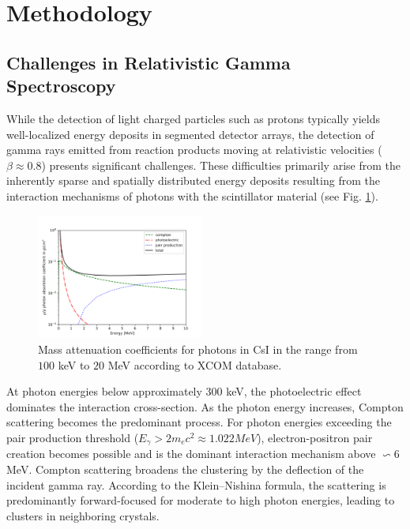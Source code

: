 \documentclass[final,5p,times,twocolumn]{elsarticle}
\begin{document}
\section{Methodology}
\label{sec:metho}
\subsection{Challenges in Relativistic Gamma Spectroscopy}\label{s_sec:gamma_spec}
While the detection of light charged particles such as protons typically yields well-localized energy deposits in segmented detector arrays, the detection of gamma rays emitted from reaction products moving at relativistic velocities ($\beta \approx 0.8$) presents significant challenges. These difficulties primarily arise from the inherently sparse and spatially distributed energy deposits resulting from the interaction mechanisms of photons with the scintillator material (see Fig. \ref{fig:csi})\cite{kolanoski2016teilchendetektoren}.\newline
\begin{figure}[!htb]
	\centering 
	\includegraphics[width=0.49\textwidth]{csi_attuenuation.png}	
	\caption{Mass attenuation coefficients for photons in CsI in the range from $100$ keV to $20$ MeV according to XCOM database\cite{seltzer2010xcom}.} 
	\label{fig:csi}%
\end{figure}
At photon energies below approximately $300$ keV, the photoelectric effect dominates the interaction cross-section. As the photon energy increases, Compton scattering becomes the predominant process. For photon energies exceeding the pair production threshold ($E_{\gamma} > 2m_{e}c^2 \approx 1.022 MeV$), electron-positron pair creation becomes possible and is the dominant interaction mechanism above $\backsim 6$ MeV.\newline
Compton scattering broadens the clustering by the deflection of the incident gamma ray. According to the Klein–Nishina formula, the scattering is predominantly forward-focused for moderate to high photon energies\cite{klein1929streuung}, leading to clusters in neighboring crystals.\newline
\end{document}
